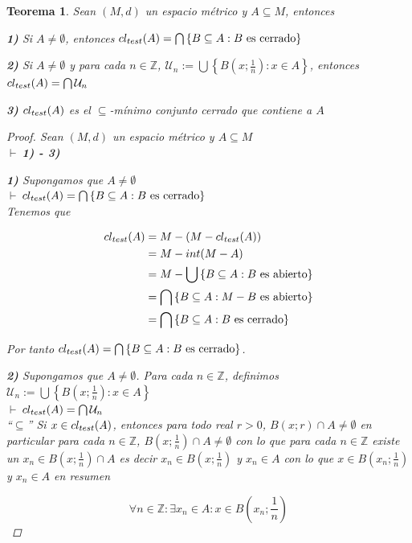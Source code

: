 \documentclass[oneside]{book} %
\theoremstyle{Teorema}
\newtheorem{Teorema}[Definicion]{Teorema}
\theoremstyle{Ejemplos}
\theoremstyle{[Obs]}
\def \test {test}
\newcommand{\cerradura}[2][\test]{\ifx \test #1 {\overline{#2}} \else {cl_{#1}(#2)} \fi} %
\renewcommand{\{}{\left\lbrace} %
\renewcommand{\}}{\right\rbrace} %
\newcommand{\n}{\cap} %
\newcommand{\U}{\bigcup} %
\newcommand{\N}{\bigcap} %
\renewcommand{\sc}{\subseteq} %
\newcommand{\Z}{\mathbb{Z}} %
\newcommand{\pd}{$\vdash\ $} %
\begin{document}
			\begin{Teorema}\setlength{\parindent}{0em}
			
				Sean $(M, d)$ un espacio métrico y $A \sc M$, entonces 

				\textbf{1)} Si $A \neq \emptyset$, entonces $\cerradura{A} = \N \{ B \sc A : B \text{ es cerrado} \}$

				\textbf{2)} Si $A \neq \emptyset$ y para cada $n \in \Z$, $\mathcal{U}_n := \U\{ B(x;\frac{1}{n}) : x \in A \}$, entonces $\cerradura{A} = \N \mathcal{U}_n$

				\textbf{3)} $\cerradura{A}$ es el $\sc$-mínimo conjunto cerrado que contiene a $A$

				\begin{proof}
					
					Sean $(M, d)$ un espacio métrico y $A \sc M$ \\ 
					\pd \textbf{1) - 3)}

					\textbf{1)} Supongamos que $A \neq \emptyset$ \\  
					\pd $\cerradura{A} = \N \{ B \sc A : B \text{ es cerrado} \}$ \\ 
					Tenemos que 

					\begin{align*}
						\cerradura{A} &= M - (M - \cerradura{A}) \\ 
						&= M - int(M - A) \\ 
						&= M - \U\{ B \sc A : B \text{ es abierto} \} \\ 
						&= \N\{ B \sc A : M - B \text{ es abierto} \} \\ 
						&= \N\{ B \sc A : B \text{ es cerrado} \}
					\end{align*}

					Por tanto $\cerradura{A} = \N \{ B \sc A : B \text{ es cerrado} \}$. 

					\textbf{2)} Supongamos que $A \neq \emptyset$. Para cada $n \in \Z$, definimos $\mathcal{U}_n := \U\{ B(x;\frac{1}{n}) : x \in A \}$ \\ 
					\pd $\cerradura{A} = \N \mathcal{U}_n$ \\ 
					``$\sc$'' Si $x \in \cerradura{A}$, entonces para todo real $r > 0$, $B(x;r) \n A \neq \emptyset$ en particular para cada $n \in \Z$, $B(x;\frac{1}{n}) \n A \neq \emptyset$ con lo que para cada $n \in \Z$ existe un $x_n \in B(x;\frac{1}{n}) \n A$ es decir $x_n \in B(x;\frac{1}{n})$ y $x_n \in A$ con lo que $x \in B(x_n;\frac{1}{n})$ y $x_n \in A$ en resumen 

					\[ \forall n \in \Z : \exists x_n \in A : x \in B(x_n;\textstyle\frac{1}{n}) \]


\end{proof}
\end{Teorema}
\end{document}

